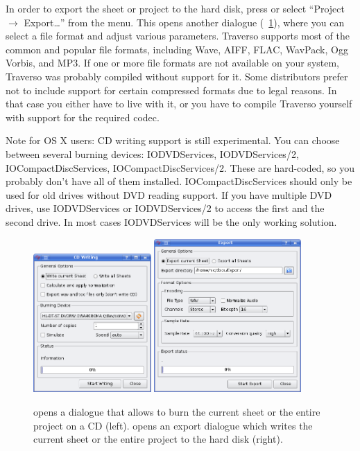 In order to export the sheet or project to the hard disk, press  or select ``Project $\rightarrow$ Export\dots'' from the menu. This opens another dialogue (\FigB~\ref{fig_exportdlg}), where you can select a file format and adjust various parameters. Traverso supports most of the common and popular file formats, including Wave, AIFF, FLAC, WavPack, Ogg Vorbis, and MP3. If one or more file formats are not available on your system, Traverso was probably compiled without support for it. Some distributors prefer not to include support for certain compressed formats due to legal reasons. In that case you either have to live with it, or you have to compile Traverso yourself with support for the required codec.

Note for OS X users: CD writing support is still experimental. You can choose between several burning devices: IODVDServices, IODVDServices/2, IOCompactDiscServices, IOCompactDiscServices/2. These are hard-coded, so you probably don't have all of them installed. IOCompactDiscServices should only be used for old drives without DVD reading support. If you have multiple DVD drives, use IODVDServices or IODVDServices/2 to access the first and the second drive. In most cases IODVDServices will be the only working solution.

\begin{figure}[t]
 \centering
 \includegraphics[width=0.4\textwidth]{images/exportdlg}\qquad
 \includegraphics[width=0.5\textwidth]{images/exportdlg1}
 \caption{ opens a dialogue that allows to burn the current sheet or the entire project on a CD (left).  opens an export dialogue which writes the current sheet or the entire project to the hard disk (right).}
 \label{fig_exportdlg}
\end{figure}

